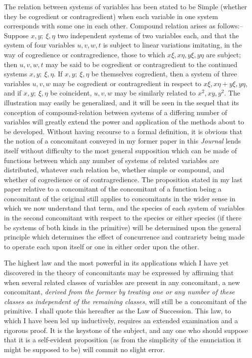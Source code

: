 \documentclass[11pt]{article}
\newcommand{\sourcepage}[1]{\marginpar{\scriptsize p.~#1}}
\begin{document}
{{\sourcepage{287}
The relation between systems of variables has been stated to be Simple (whether they be cogredient or contragredient) when each variable in one system corresponds with some one in each other. Compound relation arises as follows:--Suppose $x,y;\ \xi,\eta$ two independent systems of two variables each, and that the system of four variables $u,v,w,t$ is subject to linear variations imitating, in the way of cogredience or contragredience, those to which $x\xi,x\eta,y\xi,y\eta$ are subject; then $u,v,w,t$ may be said to be cogredient or contragredient to the continued systems $x,y;\ \xi,\eta$. If $x,y;\ \xi,\eta$ be themselves cogredient, then a system of three variables $u,v,w$ may be cogredient or contragredient in respect to $x\xi,x\eta+y\xi,y\eta$, and if $x,y;\ \xi,\eta$ be coincident, $u,v,w$ may be similarly related to $x^2,xy,y^2$. The illustration may easily be generalized, and it will be seen in the sequel that its conception of compound-relation between systems of a differing number of variables will greatly extend the power and application of the methods about to be developed. Without having recourse to a formal definition, it is obvious that the notion of a concomitant conveyed in my former paper in this \emph{Journal} lends itself without difficulty to the most general supposition which can be made of functions between which any number of systems of related variables are distributed, whatever such relation be, whether simple or compound, and whether of cogredience or of contragredience. The proposition stated in my last paper relative to a concomitant of the concomitant of a function being a concomitant of the original still applies to concomitants in the wider sense in which we now understand that term, and the species of each system of variables in the second concomitant with respect to the species or either species (if there be systems of both kinds in the primitive) will be determined upon the general principle which determines the effect of concurrence and contrariety being made to operate each upon itself or one in either order upon the other.

The highest law and the most powerful in its applications which I have yet discovered in the theory of concomitants may be expressed by affirming that when several related classes of variables are present in any concomitant, a new concomitant, \emph{derived from the former by treating one or any number of these classes as independent of the remaining classes}, will still be a concomitant of the primitive. I shall quote this hereafter as the Law of Succession. This law, to which I have been led up inductively, requires an extended examination and a rigorous proof. It is the keystone of the subject, and any one who should suppose that it is a self-evident proposition (as from the simplicity of the enunciation it might be supposed to be) will commit no slight error.

}}
\end{document}
